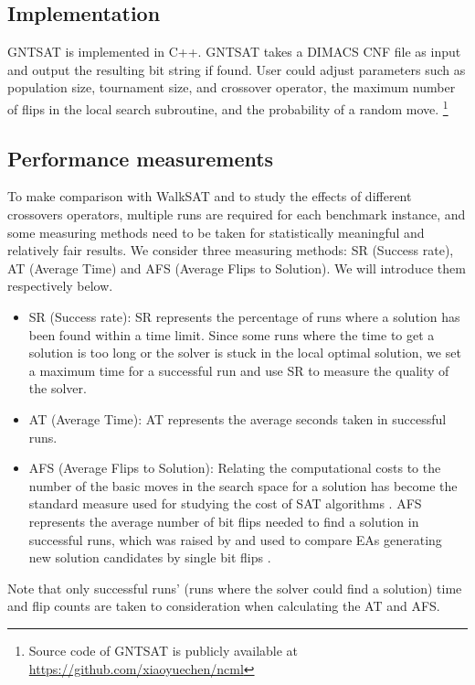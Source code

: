 \subsection{Implementation}
GNTSAT is implemented in C++. GNTSAT takes a DIMACS CNF file as input and
output the resulting bit string if found. User could adjust parameters such as
population size, tournament size, and crossover operator, the maximum number
of flips in the local search subroutine, and the probability of a random move.
\footnote{Source code of GNTSAT is publicly available at \url{https://github.com/xiaoyuechen/ncml}}

\subsection{Performance measurements}
To make comparison with WalkSAT \parencite{selman1994noise} and to study the
effects of different crossovers operators, multiple runs are required for each
benchmark instance, and some measuring methods need to be taken for
statistically meaningful and relatively fair results. We consider three
measuring methods: SR (Success rate), AT (Average Time) and AFS (Average Flips
to Solution). We will introduce them respectively below.
\begin{itemize}
	\item
	      SR (Success rate): SR represents the percentage of runs where a solution has
	      been found within a time limit. Since some runs where the time to get a
	      solution is too long or the solver is stuck in the local optimal solution, we
	      set a maximum time for a successful run and use SR to measure the quality of
	      the solver.
	\item
	      AT (Average Time): AT represents the average seconds taken in successful runs.
	\item
	      AFS (Average Flips to Solution): Relating the computational costs to the
	      number of the basic moves in the search space for a solution has become the
	      standard measure used for studying the cost of SAT algorithms
	      \parencite{Singer2000}. AFS represents the average number of bit flips needed
	      to find a solution in successful runs, which was raised by
	      \citeauthor{Voss} and used to compare EAs generating new solution
	      candidates by single bit flips \parencite{Voss}.
\end{itemize}

Note that only successful runs' (runs where the solver could find a solution)
time and flip counts are taken to consideration when calculating the AT and
AFS.
